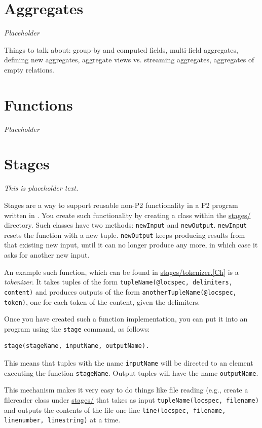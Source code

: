 \documentclass{article}
\begin{document}
\section{Aggregates}
\label{sec:aggregates}

\emph{Placeholder}

Things to talk about: group-by and computed fields, multi-field
aggregates, defining new aggregates, aggregate views vs. streaming
aggregates, aggregates of empty relations.



\section{Functions}
\label{sec:functions}

\emph{Placeholder}


\section{Stages}

\emph{This is placeholder text.}

Stages are a way to support reusable non-P2 functionality in a P2
program written in \ol. You create such functionality by creating a
class within the \url{stages/} directory. Such classes have two methods:
\texttt{newInput} and \texttt{newOutput}. \texttt{newInput} resets the
function with a new tuple. \texttt{newOutput} keeps producing results
from that existing new input, until it can no longer produce any more,
in which case it asks for another new input. 

An example such function, which can be found in
\url{stages/tokenizer.[Ch]} is a \emph{tokenizer}. It takes tuples of
the form \lstinline$tupleName(@locspec, delimiters, content)$ and
produces outputs of the form
\lstinline$anotherTupleName(@locspec, token)$, one for each token of the content, given the delimiters. 

Once you have created such a function implementation, you can put it
into an \ol program using the \lstinline$stage$ command, as follows: 
\begin{lstlisting}
stage(stageName, inputName, outputName).
\end{lstlisting}

This means that tuples with the name \lstinline$inputName$ will be
directed to an element executing the function
\lstinline$stageName$. Output tuples will have the name
\lstinline$outputName$. 

This mechanism makes it very easy to do things like file reading (e.g.,
create a filereader class under \url{stages/} that takes as input
\lstinline$tupleName(locspec, filename)$ and outputs the contents of the file one
line \lstinline$line(locspec, filename, linenumber, linestring)$ at a
time.
\end{document}

